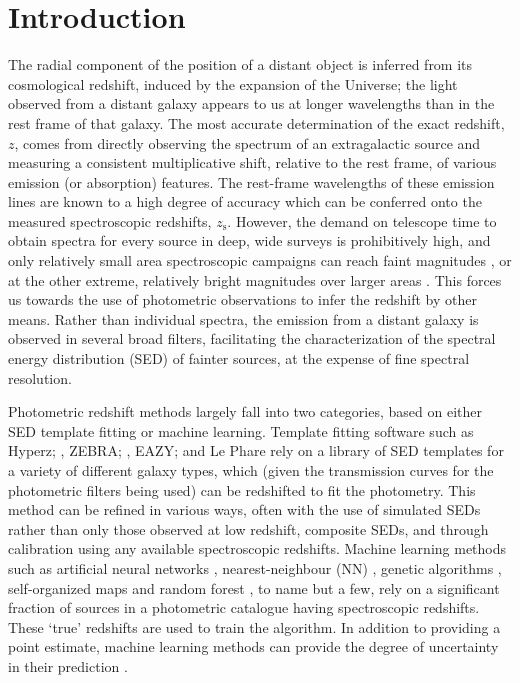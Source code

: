 \documentclass[useAMS,usenatbib,fleqn]{mn2e}
\begin{document}
\section{Introduction}
The radial component of the position of a distant object is inferred from its cosmological redshift, induced by the expansion of the Universe; the light observed from a distant galaxy appears to us at longer wavelengths than in the rest frame of that galaxy. The most accurate determination of the exact redshift, $z$, comes from directly observing the spectrum of an extragalactic source and measuring a consistent multiplicative shift, relative to the rest frame, of various emission (or absorption) features. The rest-frame wavelengths of these emission lines are known to a high degree of accuracy which can be conferred onto the measured spectroscopic redshifts, $z_\textrm{s}$. However, the demand on telescope time to obtain spectra for every source in deep, wide surveys is prohibitively high, and only relatively small area spectroscopic campaigns can reach faint magnitudes \citep[e.g.][]{Lilly2009,LeFevre2013,LeFevre2015}, or at the other extreme, relatively bright magnitudes over larger areas \citep[e.g.][]{2dfgrs,GAMA,SDSS3}.
This forces us towards the use of photometric observations to infer the redshift by other means. Rather than individual spectra, the emission from a distant galaxy is observed in several broad filters, facilitating the characterization of the spectral energy distribution (SED) of fainter sources, at the expense of fine spectral resolution.

Photometric redshift methods largely fall into two categories, based on either SED template fitting or machine learning. Template fitting software such as {\sc Hyperz}; \citep[][]{Hyperz}, {\sc ZEBRA}; \citep{ZEBRA}, {\sc EAZY}; \citep[][]{EAZY} and {\sc Le Phare} \citep[][]{Ilbert2006} rely on a library of SED templates for a variety of different galaxy types, which (given the transmission curves for the photometric filters being used) can be redshifted to fit the photometry. This method can be refined in various ways, often with the use of simulated SEDs rather than only those observed at low redshift, composite SEDs, and through calibration using any available spectroscopic redshifts. Machine learning methods such as artificial neural networks \citep[e.g. {\sc ANNz};][]{Firth2003,Collister04}, nearest-neighbour (NN) \citep{Ball2008}, genetic algorithms \citep[e.g.][]{Hogan2015}, self-organized maps \citep[][]{Geach2012} and random forest \citep[][]{kind2013}, to name but a few, rely on a significant fraction of sources in a photometric catalogue having spectroscopic redshifts. These `true' redshifts are used to train the algorithm. In addition to providing a point estimate, machine learning methods can provide the degree of uncertainty in their prediction \citep{kind2013,bonnett2015,rau2015}.
\end{document}
